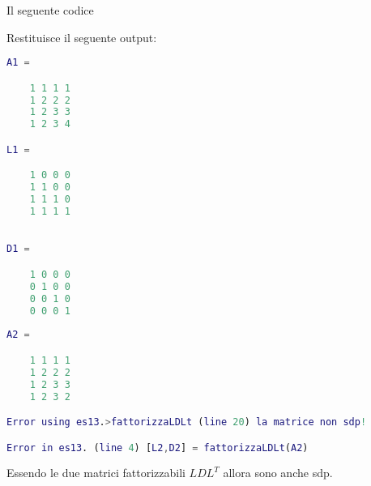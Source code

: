 Il seguente codice




Restituisce il seguente output:

\begin{lstlisting}[language=Matlab, basicstyle = \small]
A1 = 

	1 1 1 1 
	1 2 2 2 
	1 2 3 3 
	1 2 3 4 

L1 = 

	1 0 0 0 
	1 1 0 0 
	1 1 1 0 
	1 1 1 1
	

D1 = 

	1 0 0 0 
	0 1 0 0 
	0 0 1 0 
	0 0 0 1
	
A2 = 

	1 1 1 1 
	1 2 2 2 
	1 2 3 3 
	1 2 3 2 

Error using es13.>fattorizzaLDLt (line 20) la matrice non sdp! 

Error in es13. (line 4) [L2,D2] = fattorizzaLDLt(A2)

\end{lstlisting}

Essendo le due matrici fattorizzabili $LDL^T$ allora sono anche sdp.
